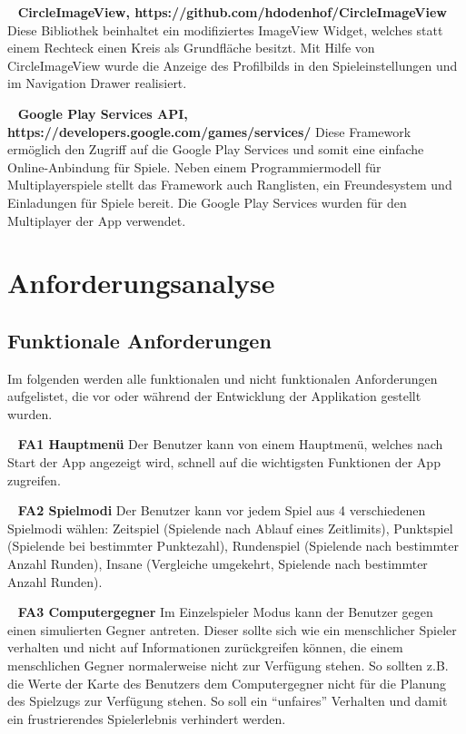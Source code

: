 \documentclass{scrartcl}
\begin{document}
\ \newline
\textbf{CircleImageView, https://github.com/hdodenhof/CircleImageView} \newline
Diese Bibliothek beinhaltet ein modifiziertes ImageView Widget, welches statt
einem Rechteck einen Kreis als Grundfläche besitzt. Mit Hilfe von
CircleImageView wurde die Anzeige des Profilbilds in den Spieleinstellungen und
im Navigation Drawer realisiert.

\ \newline
\textbf{Google Play Services API, https://developers.google.com/games/services/} \newline
Diese Framework ermöglich den Zugriff auf die Google Play Services und somit
eine einfache Online-Anbindung für Spiele. Neben einem Programmiermodell für
Multiplayerspiele stellt das Framework auch Ranglisten, ein Freundesystem und
Einladungen für Spiele bereit. Die Google Play Services wurden für den
Multiplayer der App verwendet.


\section{Anforderungsanalyse}
\subsection{Funktionale Anforderungen}

Im folgenden werden alle funktionalen und nicht funktionalen Anforderungen
aufgelistet, die vor oder während der Entwicklung der Applikation gestellt
wurden.

\ \newline
\textbf{FA1 Hauptmenü} \newline
Der Benutzer kann von einem Hauptmenü, welches nach Start der App angezeigt
wird, schnell auf die wichtigsten Funktionen der App zugreifen.

\ \newline
\textbf{FA2 Spielmodi} \newline
Der Benutzer kann vor jedem Spiel aus 4 verschiedenen Spielmodi wählen:
Zeitspiel (Spielende nach Ablauf eines Zeitlimits), Punktspiel (Spielende bei
bestimmter Punktezahl), Rundenspiel (Spielende nach bestimmter Anzahl Runden),
Insane (Vergleiche umgekehrt, Spielende nach bestimmter Anzahl Runden).

\newpage
\ \newline
\textbf{FA3 Computergegner} \newline
Im Einzelspieler Modus kann der Benutzer gegen einen simulierten Gegner
antreten. Dieser sollte sich wie ein menschlicher Spieler verhalten und nicht
auf Informationen zurückgreifen können, die einem menschlichen Gegner
normalerweise nicht zur Verfügung stehen. So sollten z.B. die Werte der Karte
des Benutzers dem Computergegner nicht für die Planung des Spielzugs zur
Verfügung stehen. So soll ein \enquote{unfaires} Verhalten und damit ein
frustrierendes Spielerlebnis verhindert werden.
\end{document}
